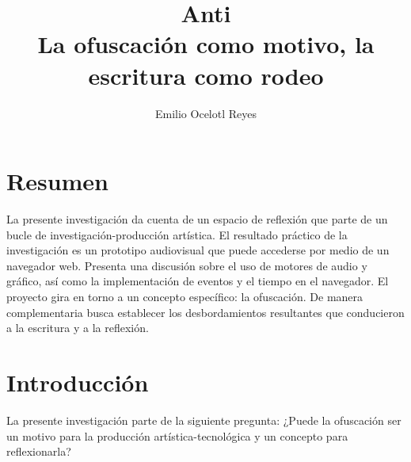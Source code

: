 \documentclass[12pt,letterpaper, twocolumn]{article}
\author{Emilio Ocelotl Reyes}
\title{Anti\\
  La ofuscación como motivo, la escritura como rodeo}
\begin{document}
\maketitle

\section*{Resumen}

La presente investigación da cuenta de un espacio de reflexión que parte de un bucle de investigación-producción artística. El resultado práctico de la investigación es un prototipo audiovisual que puede accederse por medio de un navegador web.
Presenta una discusión sobre el uso de motores de audio y gráfico, así como la implementación de eventos y el tiempo en el navegador.
El proyecto gira en torno a un concepto específico: la ofuscación. De manera complementaria busca establecer los desbordamientos resultantes que conducieron a la escritura y a la reflexión. 

\section*{Introducción}

La presente investigación parte de la siguiente pregunta: ¿Puede la ofuscación ser un motivo para la producción artística-tecnológica y un concepto para reflexionarla? 








\end{document}
